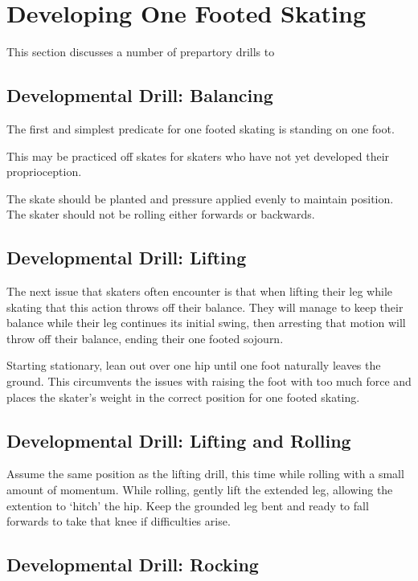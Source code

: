 \section{Developing One Footed Skating}
\label{sec:one_foot/development}


This section discusses a number of prepartory drills to  


\subsection*{Developmental Drill: Balancing}
The first and simplest predicate for one footed skating is standing on one foot. 

This may be practiced off skates for skaters who have not yet developed their proprioception.    

The skate should be planted and pressure applied evenly to maintain position.   
The skater should not be rolling either forwards or backwards.

\subsection*{Developmental Drill: Lifting}
The next issue that skaters often encounter is that when lifting their leg while skating that this action throws off their balance.
They will manage to keep their balance while their leg continues its initial swing, then arresting that motion will throw off their balance, ending their one footed sojourn.  


Starting stationary, lean out over one hip until one foot naturally leaves the ground.
This circumvents the issues with raising the foot with too much force and places the skater's weight in the correct position for one footed skating.    


\subsection*{Developmental Drill: Lifting and Rolling}
 

Assume the same position as the lifting drill, this time while rolling with a small amount of momentum. 
While rolling, gently lift the extended leg, allowing the extention to `hitch' the hip.
Keep the grounded leg bent and ready to fall forwards to take that knee if difficulties arise.  


\subsection*{Developmental Drill: Rocking}

